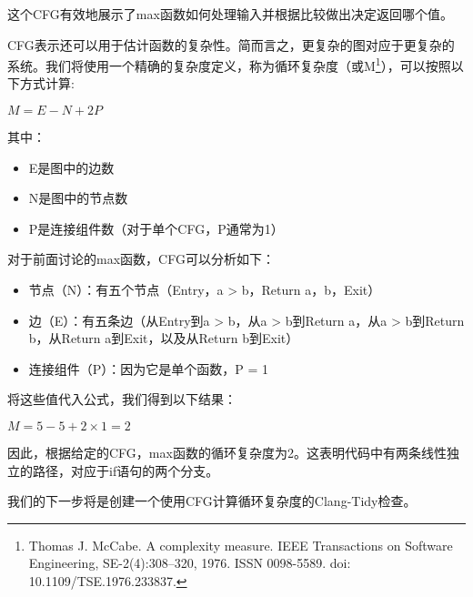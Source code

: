 这个CFG有效地展示了max函数如何处理输入并根据比较做出决定返回哪个值。

CFG表示还可以用于估计函数的复杂性。简而言之，更复杂的图对应于更复杂的系统。我们将使用一个精确的复杂度定义，称为循环复杂度（或M\footnote{Thomas J. McCabe. A complexity measure. IEEE Transactions on Software Engineering, SE-2(4):308–320, 1976. ISSN 0098-5589. doi: 10.1109/TSE.1976.233837.}），可以按照以下方式计算:

$M = E - N + 2P$

其中：

\begin{itemize}
\item
E是图中的边数

\item
N是图中的节点数

\item
P是连接组件数（对于单个CFG，P通常为1）
\end{itemize}

对于前面讨论的max函数，CFG可以分析如下：

\begin{itemize}
\item
节点（N）：有五个节点（Entry，a > b，Return a，b，Exit）

\item
边（E）：有五条边（从Entry到a > b，从a > b到Return a，从a > b到Return b，从Return a到Exit，以及从Return b到Exit）

\item
连接组件（P）：因为它是单个函数，P = 1
\end{itemize}

将这些值代入公式，我们得到以下结果：

$ M = 5 − 5 + 2 × 1 = 2$

因此，根据给定的CFG，max函数的循环复杂度为2。这表明代码中有两条线性独立的路径，对应于if语句的两个分支。

我们的下一步将是创建一个使用CFG计算循环复杂度的Clang-Tidy检查。





































